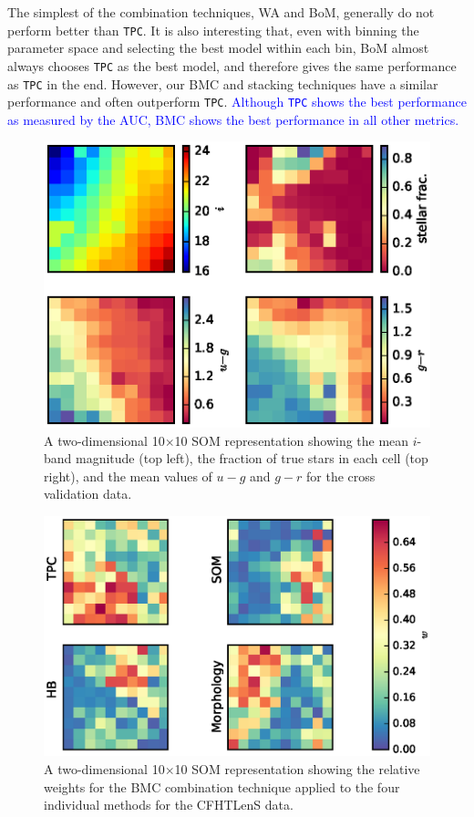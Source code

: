 \documentclass[useAMS,usenatbib]{mn2e}
\begin{document}
The simplest of the combination techniques, WA and BoM,
generally do not perform better than \texttt{TPC}.
It is also interesting that,
even with binning the parameter space and selecting the best model
within each bin,
BoM almost always chooses \texttt{TPC} as the best model,
and therefore gives the same performance as \texttt{TPC} in the end.
However, our BMC and stacking techniques have a similar performance
and often outperform \texttt{TPC}.
\textcolor{blue}{
Although \texttt{TPC} shows the best performance as measured by the AUC,
BMC shows the best performance in all other metrics.
}

\begin{figure}
  \centering
  \includegraphics[width=\linewidth]{figures/som_colors.eps}
  \caption{A two-dimensional 10$\times$10 SOM representation
           showing the mean $i$-band magnitude (top left),
           the fraction of true stars in each cell (top right),
           and the mean values of $u-g$ and $g-r$
           for the cross validation data.}
  \label{fig:som_colors}
\end{figure}

\begin{figure}
  \centering
  \includegraphics[width=\linewidth]{figures/weights.eps}
  \caption{A two-dimensional 10$\times$10 SOM representation
           showing the relative weights for the BMC combination technique
           applied to the four individual methods for the CFHTLenS data.}
  \label{fig:weights}
\end{figure}
\end{document}
